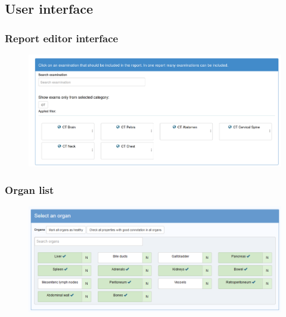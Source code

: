 \documentclass{beamer}
\begin{document}
\subsection{User interface}
\begin{frame}
\frametitle{Report editor interface}
\begin{figure}
	\centering
	\includegraphics[width=1\linewidth]{../examination-list}
	\label{fig:examination-list}
\end{figure}
\end{frame}

\begin{frame}
\frametitle{Organ list}
\begin{figure}
	\centering
	\includegraphics[width=1\linewidth]{../report-organs}
	\label{fig:organ-list}
\end{figure}
\end{frame}
\end{document}
